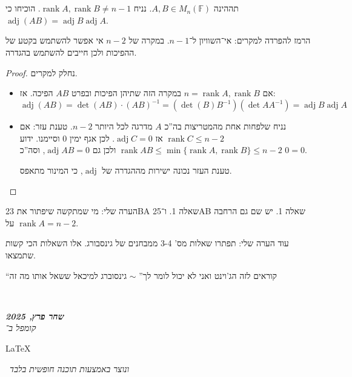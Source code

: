 \documentclass[]{article}
\newcommand\en[1] {\begin{otherlanguage}{english}#1\end{otherlanguage}}
\newcommand\ndoc  {\dotfill \\ \vfil {\begin{center}
			{\textbf{\textit{שחר פרץ, 2025}} \\
				\scriptsize \textit{קומפל ב־}\en{\LaTeX}\,\textit{ ונוצר באמצעות תוכנה חופשית בלבד}}
	\end{center}} \vfil	}
\DeclareMathOperator{\adj}    {adj}
\DeclareMathOperator{\rk}     {rank}
\newcommand\F         {\mathbb{F}}
\newcommand\op    {^{-1}}
\theoremstyle{definition}
\begin{document}
	\section{}
	תההינה $A, B \in M_n(\F)$. נניח $\rk A, \rk B \neq n - 1$. הוכיחו כי $\adj(AB) = \adj B \adj A$. 
	
		הרמז להפרדה למקרים: אי־השוויון ל־$n - 1$. במקרה של $n -2$ אי אפשר להשתמש בקטע של ההפיכות ולכן חייבים להשתמש בהגדרה. 
	\begin{proof}
		נחלק למקרים. 
		\begin{itemize}
			\item אם $n = \rk A, \rk B$ במקרה הזה שתיהן הפיכות ובפרט $AB$ הפיכה. אז: 
			\[ \adj(AB) = \det(AB) \cdot (AB)\op = (\det(B) B\op)(\det A A\op) = \adj B \adj A \]
			\item נניח שלפחות אחת מהמטריצות בה''כ $A$ מדרגה לכל היותר $n - 2$. טענת עזר: אם $\rk C \le n - 2$ אז $\adj C = 0$. לכן אגף ימין $0$ וסיימנו. ידוע $\rk AB \le \min\{\rk A, \rk B\} \le n - 2$ ולכן גם $\adj AB = 0$, וסה''כ $0 = 0$. 
			
			טענת העזר נכונה ישירות מההגדרה של $\adj$, כי המינור מתאפס. 
		\end{itemize}
	\end{proof}
	הערה שלי: מי שמתקשה שיפתור את 23BA שאלה 1. ו־25AB שאלה 1. יש שם גם הרחבה על $\rk A = n - 2$. 
	
	עוד הערה שלי: תפתרו שאלות מס' 3-4 ממבחנים של גינסבורג. אלו השאלות הכי קשות שתמצאו. 
	
	``קוראים לזה הג'וינט ואני לא יכול לומר לך'' $\sim$ גינסוברג למיכאל ששאל אותו מה זה
	
	
	
	
	\ndoc
\end{document}
